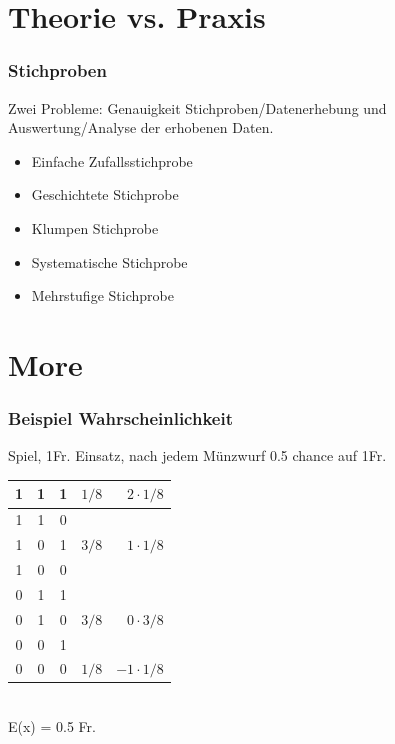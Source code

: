 \section{Theorie vs. Praxis}

\subsubsection{Stichproben}

Zwei Probleme: Genauigkeit Stichproben/Datenerhebung und Auswertung/Analyse der erhobenen Daten.

\begin{itemize}
	\item	Einfache Zufallsstichprobe
	\item	Geschichtete Stichprobe
	\item	Klumpen Stichprobe
	\item	Systematische Stichprobe
	\item	Mehrstufige Stichprobe
\end{itemize}

\section{More}

\subsubsection{Beispiel Wahrscheinlichkeit}
	
	Spiel, 1Fr. Einsatz, nach jedem Münzwurf 0.5 chance auf 1Fr.
	\\
	
	\begin{tabular}{| c c c | c | r |}
		\hline
		1 & 1 & 1 & $1/8$ & $2 \cdot 1/8$ \\
		\hline
		1 & 1 & 0 & & \\
		1 & 0 & 1 & $3/8$ & $1 \cdot 1/8$ \\
		1 & 0 & 0 &  &  \\
		\hline
		0 & 1 & 1 &  & \\
		0 & 1 & 0 & $3/8$ & $0 \cdot 3/8$ \\
		0 & 0 & 1 &  &  \\
		\hline
		0 & 0 & 0 & $1/8$ & $-1 \cdot 1/8$ \\
		\hline
		
	\end{tabular}
	\\
	
	E(x) = 0.5 Fr.

